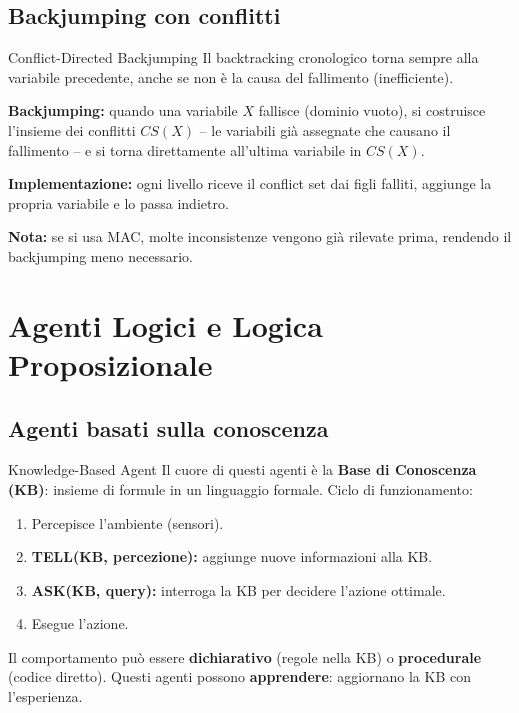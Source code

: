 \documentclass[12pt,a4paper]{article}
\begin{document}
\subsection{Backjumping con conflitti}

\begin{defbox}{Conflict-Directed Backjumping}
Il backtracking cronologico torna sempre alla variabile precedente, anche se non è la causa del fallimento (inefficiente).

\textbf{Backjumping:} quando una variabile $X$ fallisce (dominio vuoto), si costruisce l'insieme dei conflitti $CS(X)$ -- le variabili già assegnate che causano il fallimento -- e si torna direttamente all'ultima variabile in $CS(X)$.

\textbf{Implementazione:} ogni livello riceve il conflict set dai figli falliti, aggiunge la propria variabile e lo passa indietro.

\textbf{Nota:} se si usa MAC, molte inconsistenze vengono già rilevate prima, rendendo il backjumping meno necessario.
\end{defbox}

\section{Agenti Logici e Logica Proposizionale}

\subsection{Agenti basati sulla conoscenza}

\begin{defbox}{Knowledge-Based Agent}
Il cuore di questi agenti è la \textbf{Base di Conoscenza (KB)}: insieme di formule in un linguaggio formale. Ciclo di funzionamento:
\begin{enumerate}[noitemsep]
  \item Percepisce l'ambiente (sensori).
  \item \textbf{TELL(KB, percezione):} aggiunge nuove informazioni alla KB.
  \item \textbf{ASK(KB, query):} interroga la KB per decidere l'azione ottimale.
  \item Esegue l'azione.
\end{enumerate}
Il comportamento può essere \textbf{dichiarativo} (regole nella KB) o \textbf{procedurale} (codice diretto). Questi agenti possono \textbf{apprendere}: aggiornano la KB con l'esperienza.
\end{defbox}
\end{document}
